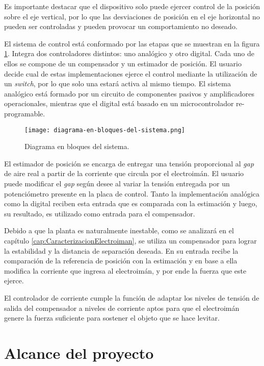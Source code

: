 Es importante destacar que el dispositivo solo puede ejercer control de la posición sobre el eje vertical, por lo que las desviaciones de posición en el eje horizontal no pueden ser controladas y pueden provocar un comportamiento no deseado.

El sistema de control está conformado por las etapas que se muestran en la figura \ref{fig:img_diagrama-en-bloques-del-sistema}. Integra dos controladores distintos: uno analógico y otro digital. Cada uno de ellos se compone de un compensador y un estimador de posición.  El usuario decide cual de estas implementaciones ejerce el control mediante la utilización de un \textsl{switch}, por lo que solo una estará activa al mismo tiempo. El sistema analógico está formado por un circuito de  componentes pasivos y amplificadores operacionales, mientras que el digital está basado en un microcontrolador re-programable.

\begin{figure}[H]
	\centering
	\texttt{[image: diagrama-en-bloques-del-sistema.png]}
	\caption{Diagrama en bloques del sistema.}
	\label{fig:img_diagrama-en-bloques-del-sistema}
\end{figure}

El estimador de posición se encarga de entregar una tensión proporcional al \textsl{gap} de aire real a partir de la corriente que circula por el electroimán. El usuario puede modificar el \textsl{gap} según desee al variar la tensión entregada por un potenciómetro presente en la placa de control. Tanto la implementación analógica como la digital reciben esta entrada que es comparada con la estimación y luego, su resultado, es utilizado como entrada para el compensador.

Debido a que la planta es naturalmente inestable, como se analizará en el capítulo \ref{cap:CaracterizacionElectroiman}, se utiliza un compensador para lograr la estabilidad y la distancia de separación deseada. En su entrada recibe la comparación de la referencia de posición con la estimación y en base a ella modifica la corriente que ingresa al electroimán, y por ende la fuerza que este ejerce.

El controlador de corriente cumple la función de adaptar los niveles de tensión de salida del compensador a niveles de corriente aptos para que el electroimán genere la fuerza suficiente para sostener el objeto que se hace levitar.


\section{Alcance del proyecto}

